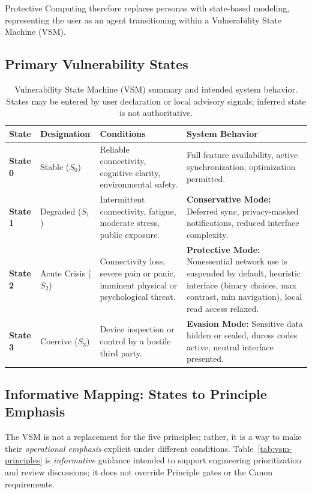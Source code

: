 \documentclass[12pt]{article}
\begin{document}
Protective Computing therefore replaces personas with state-based modeling, representing the user as an agent transitioning within a Vulnerability State Machine (VSM).

\subsection{Primary Vulnerability States}
\begin{table}[h]
\centering
\begin{tabular}{@{}llp{5cm}p{4cm}@{}}
\toprule
State & Designation & Conditions & System Behavior \\
\midrule
\textbf{State 0} & Stable ($S_0$) & Reliable connectivity, cognitive clarity, environmental safety. & Full feature availability, active synchronization, optimization permitted. \\
\midrule
\textbf{State 1} & Degraded ($S_1$) & Intermittent connectivity, fatigue, moderate stress, public exposure. & \textbf{Conservative Mode:} Deferred sync, privacy-masked notifications, reduced interface complexity. \\
\midrule
\textbf{State 2} & Acute Crisis ($S_2$) & Connectivity loss, severe pain or panic, imminent physical or psychological threat. & \textbf{Protective Mode:} Nonessential network use is suspended by default, heuristic interface (binary choices, max contrast, min navigation), local read access relaxed. \\
\midrule
\textbf{State 3} & Coercive ($S_3$) & Device inspection or control by a hostile third party. & \textbf{Evasion Mode:} Sensitive data hidden or sealed, duress codes active, neutral interface presented. \\
\bottomrule
\end{tabular}
\caption{Vulnerability State Machine (VSM) summary and intended system behavior. States may be entered by user declaration or local advisory signals; inferred state is not authoritative.}
\label{tab:vsm}
\end{table}

\subsection{Informative Mapping: States to Principle Emphasis}
The VSM is not a replacement for the five principles; rather, it is a way to make their \emph{operational emphasis} explicit under different conditions. Table~\ref{tab:vsm-principles} is \emph{informative} guidance intended to support engineering prioritization and review discussions; it does not override Principle gates or the Canon requirements.
\end{document}
